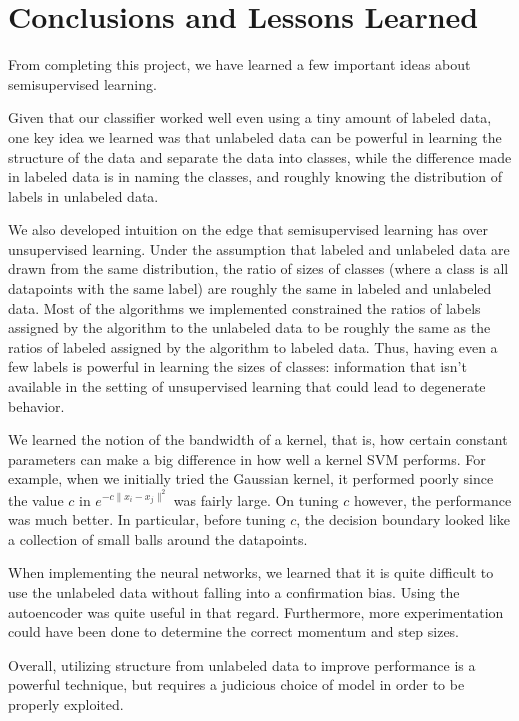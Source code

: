 \documentclass[11pt]{article}
\begin{document}
\section{Conclusions and Lessons Learned}

From completing this project, we have learned a few important ideas about semisupervised learning. 

Given that our classifier worked well even using a tiny amount of labeled data,
one key idea we learned was that unlabeled data can be powerful in learning the structure of the data
and separate the data into classes, while the difference made in labeled data is in naming the classes,
and roughly knowing the distribution of labels in unlabeled data.

We also developed intuition on the edge that semisupervised learning has over unsupervised learning.
Under the assumption that labeled and unlabeled data are drawn from the same distribution, the ratio of
sizes of classes (where a class is all datapoints with the same label) are roughly the same in labeled
and unlabeled data. Most of the algorithms we implemented constrained the ratios of labels
assigned by the algorithm to the unlabeled data to be roughly the same as the ratios of labeled assigned
by the algorithm to labeled data. Thus, having even a few labels is powerful in learning the sizes of
classes: information that isn't available in the setting of unsupervised learning that could lead to
degenerate behavior.

We learned the notion of the bandwidth of a kernel, that is,
how certain constant parameters can make a big difference in how well
a kernel SVM performs. For example, when we initially tried the
Gaussian kernel, it performed poorly since the value
$c$ in $e^{-c\|x_i-x_j\|^2}$ was fairly large.
On tuning $c$ however, the performance was much better. In particular,
before tuning $c$, the decision boundary looked like a collection of
small balls around the datapoints.

When implementing the neural networks, we learned that it is quite difficult to use the unlabeled data without falling into a confirmation bias. Using the autoencoder was quite useful in that regard. Furthermore, more experimentation could have been done to determine the correct momentum and step sizes.

Overall, utilizing structure from unlabeled data to improve performance is a powerful technique, but requires a judicious choice of model in order to be properly exploited.



\end{document}
